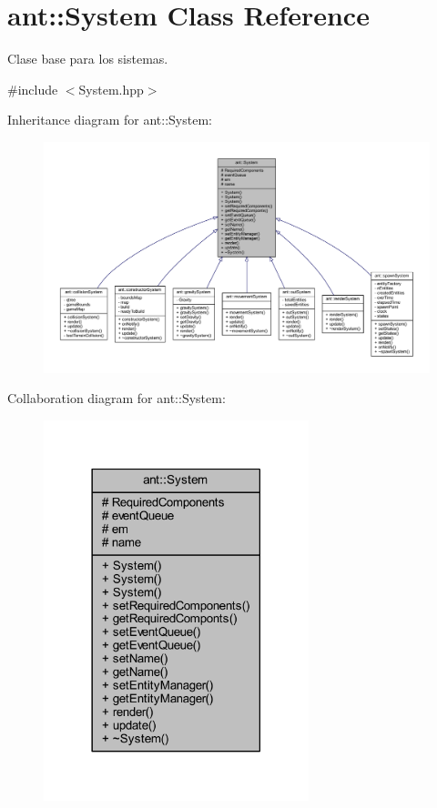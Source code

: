 \hypertarget{classant_1_1_system}{\section{ant\+:\+:System Class Reference}
\label{classant_1_1_system}
}


Clase base para los sistemas.  




{\ttfamily \#include $<$System.\+hpp$>$}



Inheritance diagram for ant\+:\+:System\+:
\nopagebreak
\begin{figure}[H]
\begin{center}
\leavevmode
\includegraphics[width=350pt]{da/d5f/classant_1_1_system__inherit__graph}
\end{center}
\end{figure}


Collaboration diagram for ant\+:\+:System\+:
\nopagebreak
\begin{figure}[H]
\begin{center}
\leavevmode
\includegraphics[width=218pt]{d0/daf/classant_1_1_system__coll__graph}
\end{center}
\end{figure}

